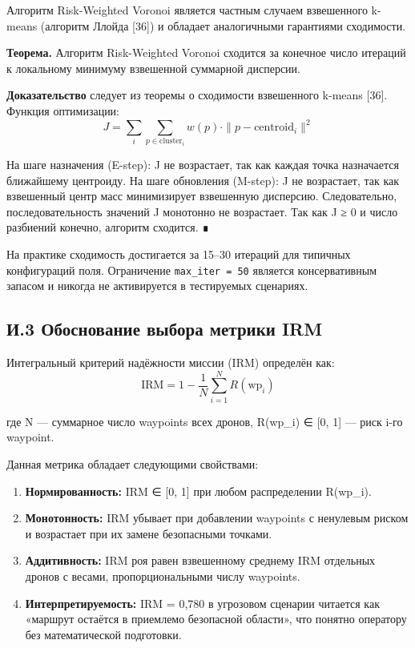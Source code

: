 \documentclass[14pt,a4paper]{extarticle}
\providecommand{\tightlist}{%
  \setlength{\itemsep}{0pt}\setlength{\parskip}{0pt}}
\begin{document}
Алгоритм Risk-Weighted Voronoi является частным случаем взвешенного k-means (алгоритм Ллойда {[}36{]}) и обладает аналогичными гарантиями сходимости.

\textbf{Теорема.} Алгоритм Risk-Weighted Voronoi сходится за конечное число итераций к локальному минимуму взвешенной суммарной дисперсии.

\textbf{Доказательство} следует из теоремы о сходимости взвешенного k-means {[}36{]}. Функция оптимизации: \[J = \sum_{i} \sum_{p \in \mathrm{cluster}_i} w(p) \cdot \| p - \mathrm{centroid}_i \|^2\]

На шаге назначения (E-step): J не возрастает, так как каждая точка назначается ближайшему центроиду. На шаге обновления (M-step): J не возрастает, так как взвешенный центр масс минимизирует взвешенную дисперсию. Следовательно, последовательность значений J монотонно не возрастает. Так как J ≥ 0 и число разбиений конечно, алгоритм сходится. ∎

На практике сходимость достигается за 15--30 итераций для типичных конфигураций поля. Ограничение \texttt{max\_iter\ =\ 50} является консервативным запасом и никогда не активируется в тестируемых сценариях.

\hypertarget{ux438.3-ux43eux431ux43eux441ux43dux43eux432ux430ux43dux438ux435-ux432ux44bux431ux43eux440ux430-ux43cux435ux442ux440ux438ux43aux438-irm}{%
\subsection{И.3 Обоснование выбора метрики IRM}\label{ux438.3-ux43eux431ux43eux441ux43dux43eux432ux430ux43dux438ux435-ux432ux44bux431ux43eux440ux430-ux43cux435ux442ux440ux438ux43aux438-irm}}

Интегральный критерий надёжности миссии (IRM) определён как: \[\mathrm{IRM} = 1 - \frac{1}{N} \sum_{i=1}^{N} R(\mathrm{wp}_i)\]

где N --- суммарное число waypoints всех дронов, R(wp\_i) ∈ {[}0, 1{]} --- риск i-го waypoint.

Данная метрика обладает следующими свойствами:

\begin{enumerate}
\def\labelenumi{\arabic{enumi}.}
\tightlist
\item
  \textbf{Нормированность:} IRM ∈ {[}0, 1{]} при любом распределении R(wp\_i).
\item
  \textbf{Монотонность:} IRM убывает при добавлении waypoints с ненулевым риском и возрастает при их замене безопасными точками.
\item
  \textbf{Аддитивность:} IRM роя равен взвешенному среднему IRM отдельных дронов с весами, пропорциональными числу waypoints.
\item
  \textbf{Интерпретируемость:} IRM = 0,780 в угрозовом сценарии читается как «маршрут остаётся в приемлемо безопасной области», что понятно оператору без математической подготовки.
\end{enumerate}
\end{document}
